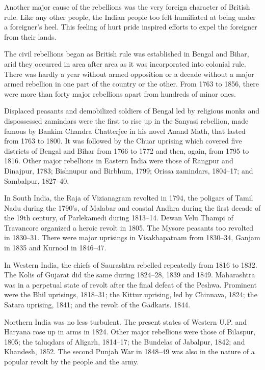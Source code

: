Another major cause of the rebellions was the very foreign character of British rule. Like any other people, the Indian people too felt humiliated at being under a foreigner's heel. This feeling of hurt pride inspired efforts to expel the foreigner from their lands.

The civil rebellions began as British rule was established in Bengal and Bihar, arid they occurred in area after area as it was incorporated into colonial rule. There was hardly a year without armed opposition or a decade without a major armed rebellion in one part of the country or the other. From 1763 to 1856, there were more than forty major rebellions apart from hundreds of minor ones.

Displaced peasants and demobilized soldiers of Bengal led by religious monks and dispossessed zamindars were the first to rise up in the Sanyasi rebellion, made famous by Bankim Chandra Chatterjee in his novel Anand Math, that lasted from 1763 to 1800. It was followed by the Chuar uprising which covered five districts of Bengal and Bihar from 1766 to 1772 and then, again, from 1795 to 1816. Other major rebellions in Eastern India were those of Rangpur and Dinajpur, 1783; Bishnupur and Birbhum, 1799; Orissa zamindars, 1804--17; and Sambalpur, 1827--40.

In South India, the Raja of Vizianagram revolted in 1794, the poligars of Tamil Nadu during the 1790's, of Malabar and coastal Andhra during the first decade of the 19th century, of Parlekamedi during 1813--14. Dewan Velu Thampi of Travancore organized a heroic revolt in 1805. The Mysore peasants too revolted in 1830--31. There were major uprisings in Visakhapatnam from 1830--34, Ganjam in 1835 and Kurnool in 1846--47.

In Western India, the chiefs of Saurashtra rebelled repeatedly from 1816 to 1832. The Kolis of Gujarat did the same during 1824--28, 1839 and 1849. Maharashtra was in a perpetual state of revolt after the final defeat of the Peshwa. Prominent were the Bhil uprisings, 1818--31; the Kittur uprising, led by Chinnava, 1824; the Satara uprising, 1841; and the revolt of the Gadkaris. 1844.

Northern India was no less turbulent. The present states of Western U.P. and Haryana rose up in arms in 1824. Other major rebellions were those of Bilaspur, 1805; the taluqdars of Aligarh, 1814--17; the Bundelas of Jabalpur, 1842; and Khandesh, 1852. The second Punjab War in 1848--49 was also in the nature of a popular revolt by the people and the army.

